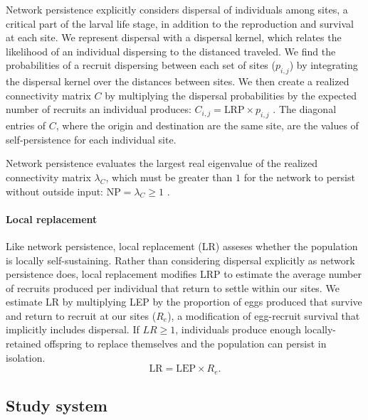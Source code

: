 \documentclass[12pt, oneside]{article}   	%
\begin{document}
Network persistence explicitly considers dispersal of individuals among sites, a critical part of the larval life stage, in addition to the reproduction and survival at each site. We represent dispersal with a dispersal kernel, which relates the likelihood of an individual dispersing to the distanced traveled. We find the probabilities of a recruit dispersing between each set of sites ($p_{i,j}$) by integrating the dispersal kernel over the distances between sites. We then create a realized connectivity matrix $C$ by multiplying the dispersal probabilities by the expected number of recruits an individual produces: $C_{i,j} = \text{LRP} \times p_{i,j}$ \citep[][though we include egg-recruit survival in LRP, rather than in $p_{i,j}$ as they do]{burgess2014beyond}. The diagonal entries of $C$, where the origin and destination are the same site, are the values of self-persistence for each individual site. 

Network persistence evaluates the largest real eigenvalue of the realized connectivity matrix $\lambda_C$, which must be greater than $1$ for the network to persist without outside input: $\text{NP} = \lambda_C \geq 1$ \citep[e.g.][]{hastings_persistence_2006, white_population_2010, burgess2014beyond}.

\paragraph*{Local replacement}

Like network persistence, local replacement (LR) asseses whether the population is locally self-sustaining. Rather than considering dispersal explicitly as network persistence does, local replacement modifies LRP to estimate the average number of recruits produced per individual that return to settle within our sites. We estimate LR by multiplying LEP by the proportion of eggs produced that survive and return to recruit at our sites ($R_e$), a modification of egg-recruit survival that implicitly includes dispersal. If $LR \geq 1$, individuals produce enough locally-retained offspring to replace themselves and the population can persist in isolation. %
\begin{equation}
\text{LR} = \text{LEP} \times R_e. \label{EQN_LR}
\end{equation}

\subsection*{Study system}
\end{document}
